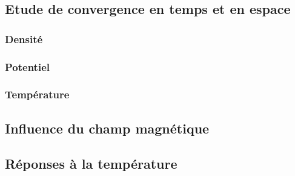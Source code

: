 \subsection{Etude de convergence en temps et en espace}
\subsubsection{Densité}
\subsubsection{Potentiel}
\subsubsection{Température}
\subsection{Influence du champ magnétique}
\subsection{Réponses à la température}
